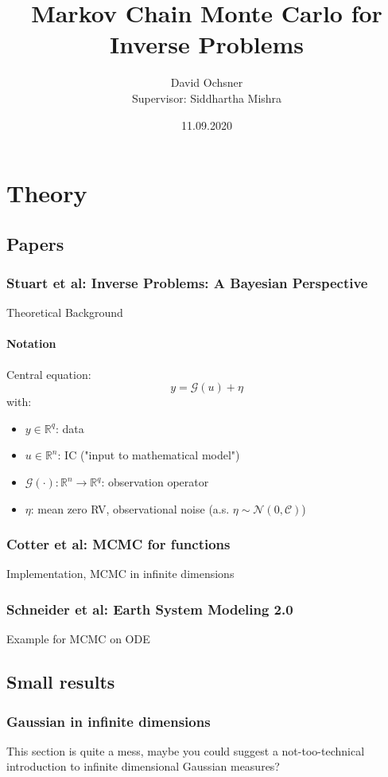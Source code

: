 \documentclass[11pt]{article}
\author{David Ochsner \\ Supervisor: Siddhartha Mishra}
\date{11.09.2020}
\title{Markov Chain Monte Carlo for Inverse Problems}
\newcommand{\C}{{\mathcal{C}}}
\newcommand{\R}{{\mathbb{R}}}
\newcommand{\G}[1]{{\mathcal{G} \left( #1 \right)}}
\newcommand{\N}[2]{\mathcal{N}\left(#1,#2\right)}
\begin{document}
\maketitle
\tableofcontents


\section{Theory}
\label{sec:org549d26d}
\subsection{Papers}
\label{sec:org611955a}
\subsubsection{Stuart et al: Inverse Problems: A Bayesian Perspective \cite{stuart_inverse_2010}}
\label{sec:org25988d5}
Theoretical Background
\paragraph{Notation}
\label{sec:org0196052}
Central equation:
$$y = \G{u} + \eta$$
with:
\begin{itemize}
\item \(y \in \R^q\): data
\item \(u \in \R^n\): IC ("input to mathematical model")
\item \(\G{\cdot} :\R^n \to \R^q\): observation operator
\item \(\eta\): mean zero RV, observational noise (a.s. \(\eta \sim \N{0}{\C}\))
\end{itemize}
\subsubsection{Cotter et al: MCMC for functions \cite{cotter_mcmc_2013}}
\label{sec:orgf0e2a66}
Implementation, MCMC in infinite dimensions
\subsubsection{Schneider et al: Earth System Modeling 2.0  \cite{schneider_earth_2017}}
\label{sec:org92af0ee}
Example for MCMC on ODE
\subsection{Small results}
\label{sec:org3ee2a3d}
\subsubsection{Gaussian in infinite dimensions}
\label{sec:orgd27466c}
This section is quite a mess, maybe you could suggest a not-too-technical introduction
to infinite dimensional Gaussian measures?
\end{document}
